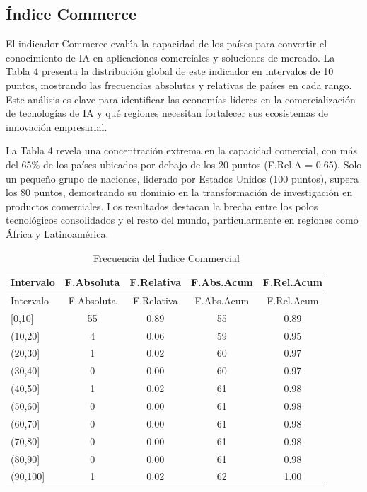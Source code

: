 \documentclass[
]{article}
\begin{document}
\begin{multicols}{2}

\subsection{Índice Commerce}

El indicador Commerce evalúa la capacidad de los países para convertir el conocimiento de IA en aplicaciones comerciales y soluciones de mercado. La Tabla 4 presenta la distribución global de este indicador en intervalos de 10 puntos, mostrando las frecuencias absolutas y relativas de países en cada rango. Este análisis es clave para identificar las economías líderes en la comercialización de tecnologías de IA y qué regiones necesitan fortalecer sus ecosistemas de innovación empresarial.

La Tabla 4 revela una concentración extrema en la capacidad comercial, con más del 65\% de los países ubicados por debajo de los 20 puntos (F.Rel.A = 0.65). Solo un pequeño grupo de naciones, liderado por Estados Unidos (100 puntos), supera los 80 puntos, demostrando su dominio en la transformación de investigación en productos comerciales. Los resultados destacan la brecha entre los polos tecnológicos consolidados y el resto del mundo, particularmente en regiones como África y Latinoamérica.

\end{multicols}

\begin{longtable}[]{@{}lcccc@{}}
\caption{Frecuencia del Índice Commercial}\tabularnewline
\toprule\noalign{}
Intervalo & F.Absoluta & F.Relativa & F.Abs.Acum & F.Rel.Acum \\
\midrule\noalign{}
\endfirsthead
\toprule\noalign{}
Intervalo & F.Absoluta & F.Relativa & F.Abs.Acum & F.Rel.Acum \\
\midrule\noalign{}
\endhead
\bottomrule\noalign{}
\endlastfoot
{[}0,10{]} & 55 & 0.89 & 55 & 0.89 \\
(10,20{]} & 4 & 0.06 & 59 & 0.95 \\
(20,30{]} & 1 & 0.02 & 60 & 0.97 \\
(30,40{]} & 0 & 0.00 & 60 & 0.97 \\
(40,50{]} & 1 & 0.02 & 61 & 0.98 \\
(50,60{]} & 0 & 0.00 & 61 & 0.98 \\
(60,70{]} & 0 & 0.00 & 61 & 0.98 \\
(70,80{]} & 0 & 0.00 & 61 & 0.98 \\
(80,90{]} & 0 & 0.00 & 61 & 0.98 \\
(90,100{]} & 1 & 0.02 & 62 & 1.00 \\
\end{longtable}
\end{document}

